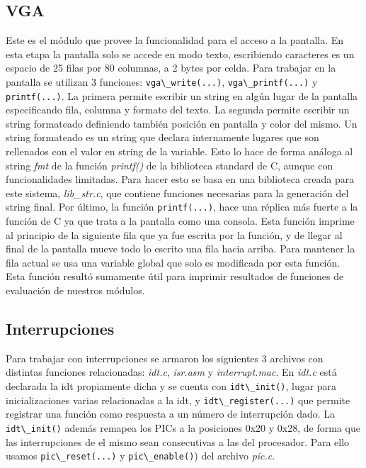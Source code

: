\documentclass[a4paper]{article}
\newcommand{\file}[1]{\textit{#1}}
\newcommand{\func}[1]{\lstinline{#1}}
\begin{document}
\subsection{VGA}

Este es el módulo que provee la funcionalidad para el acceso a la pantalla. En esta etapa la pantalla solo se accede en modo texto, escribiendo caracteres es un espacio de 25 filas por 80 columnas, a 2 bytes por celda. Para trabajar en la pantalla se utilizan 3 funciones: \func{vga\_write(...)}, \func{vga\_printf(...)} y \func{printf(...)}. La primera permite escribir un string en algún lugar de la pantalla especificando fila, columna y formato del texto. La segunda permite escribir un string formateado definiendo también posición en pantalla y color del mismo. Un string formateado es un string que declara internamente lugares que son rellenados con el valor en string de la variable. Esto lo hace de forma análoga al string \emph{fmt} de la función \emph{printf()} de la biblioteca standard de C, aunque con funcionalidades limitadas. Para hacer esto se basa en una biblioteca creada para este sistema, \file{lib\_str.c}, que contiene funciones necesarias para la generación del string final. Por último, la función \func{printf(...)}, hace una réplica más fuerte a la función de C ya que trata a la pantalla como una consola. Esta función imprime al principio de la siguiente fila que ya fue escrita por la función, y de llegar al final de la pantalla mueve todo lo escrito una fila hacia arriba. Para mantener la fila actual se usa una variable global que solo es modificada por esta función. Esta función resultó sumamente útil para imprimir resultados de funciones de evaluación de nuestros módulos.

\subsection{Interrupciones}

Para trabajar con interrupciones se armaron los siguientes 3 archivos con distintas funciones relacionadas: \file{idt.c}, \file{isr.asm} y \file{interrupt.mac}. En \file{idt.c} está declarada la idt propiamente dicha y se cuenta con \func{idt\_init()}, lugar para inicializaciones varias relacionadas a la idt, y \func{idt\_register(...)} que permite registrar una función como respuesta a un número de interrupción dado. La \func{idt\_init()} además remapea los PICs a la posiciones 0x20 y 0x28, de forma que las interrupciones de el mismo sean consecutivas a las del procesador. Para ello usamos \func{pic\_reset(...)} y \func{pic\_enable()}) del archivo \file{pic.c}. 
\end{document}
